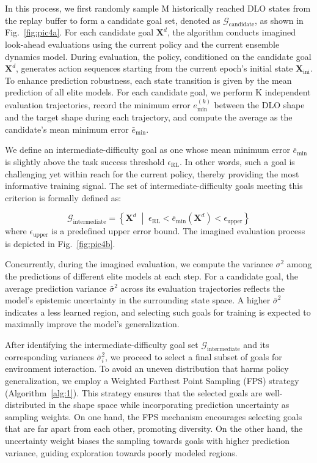 \documentclass[letterpaper, 10 pt, conference]{ieeeconf}  %
\begin{document}
In this process, we first randomly sample M historically reached DLO states from the replay buffer to form a candidate goal set, denoted as $\mathcal{G}_{\text{candidate}}$, as shown in Fig.~\ref{fig:pic4a}. For each candidate goal $\mathbf{X}^d$, the algorithm conducts imagined look-ahead evaluations using the current policy and the current ensemble dynamics model. During evaluation, the policy, conditioned on the candidate goal $\mathbf{X}^d$, generates action sequences starting from the current epoch's initial state $\mathbf{X}_\text{ini}$. To enhance prediction robustness, each state transition is given by the mean prediction of all elite models. For each candidate goal, we perform K independent evaluation trajectories, record the minimum error $e_{\text{min}}^{(k)}$ between the DLO shape and the target shape during each trajectory, and compute the average as the candidate's mean minimum error $\bar{e}_{\text{min}}$.


We define an intermediate-difficulty goal as one whose mean minimum error $\bar{e}_{\text{min}}$ is slightly above the task success threshold $\epsilon_{\text{RL}}$. In other words, such a goal is challenging yet within reach for the current policy, thereby providing the most informative training signal. The set of intermediate-difficulty goals meeting this criterion is formally defined as:

\begin{equation}
    \mathcal{G}_{\text{intermediate}} = \left\{ \mathbf{X}^d  \;\middle|\; \epsilon_{\text{RL}} < \bar{e}_{\text{min}}(\mathbf{X}^d) < \epsilon_{\text{upper}} \right\}
\end{equation}
where $\epsilon_{\text{upper}}$ is a predefined upper error bound. The imagined evaluation process is depicted in Fig.~\ref{fig:pic4b}.


Concurrently, during the imagined evaluation, we compute the variance $\sigma^2$ among the predictions of different elite models at each step. For a candidate goal, the average prediction variance $\bar{\sigma}^2$ across its evaluation trajectories reflects the model's epistemic uncertainty in the surrounding state space. A higher $\bar{\sigma}^2$ indicates a less learned region, and selecting such goals for training is expected to maximally improve the model's generalization.



After identifying the intermediate-difficulty
 goal set $\mathcal{G}_{\text{intermediate}}$ and its corresponding variances $\bar{\sigma}_i^2$, we proceed to select a final subset of goals for environment interaction. To avoid an uneven distribution that harms policy generalization, we employ a Weighted Farthest Point Sampling (FPS) strategy (Algorithm~\ref{alg:1}). This strategy ensures that the selected goals are well-distributed in the shape space while incorporating prediction uncertainty as sampling weights. On one hand, the FPS mechanism encourages selecting goals that are far apart from each other, promoting diversity. On the other hand, the uncertainty weight biases the sampling towards goals with higher prediction variance, guiding exploration towards poorly modeled regions.
\end{document}

